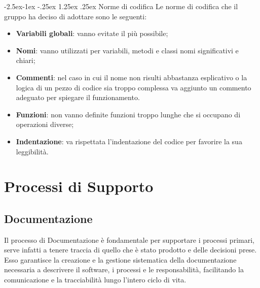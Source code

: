 \documentclass[a4paper,12pt]{article}
\makeatletter
\renewcommand\paragraph{\@startsection{paragraph}{4}{\z@}%
            {-2.5ex\@plus -1ex \@minus -.25ex}%
            {1.25ex \@plus .25ex}%
            {\normalfont\normalsize\bfseries}}
\makeatother
\begin{document}
            \paragraph{Norme di codifica}
                Le norme di codifica che il gruppo ha deciso di adottare sono le seguenti:
                \begin{itemize}
                    \item \textbf{Variabili globali}: vanno evitate il più possibile;
                    \item \textbf{Nomi}: vanno utilizzati per variabili, metodi e classi nomi significativi e chiari;
                    \item \textbf{Commenti}: nel caso in cui il nome non risulti abbastanza esplicativo o la logica di un pezzo di codice sia troppo complessa va aggiunto un commento adeguato per spiegare il funzionamento.
                    \item \textbf{Funzioni}: non vanno definite funzioni troppo lunghe che si occupano di operazioni diverse;
                    \item \textbf{Indentazione}: va rispettata l'indentazione del codice per favorire la sua leggibilità. 
                \end{itemize}
\newpage

\section{Processi di Supporto}
    \subsection{Documentazione}
        Il processo di Documentazione è fondamentale per supportare i processi primari, serve infatti a tenere traccia di quello che è stato prodotto e delle decisioni prese.
        Esso garantisce la creazione e la gestione sistematica della documentazione necessaria a descrivere il software, i processi e le responsabilità, facilitando la comunicazione e la tracciabilità lungo l'intero ciclo di vita.
\end{document}
